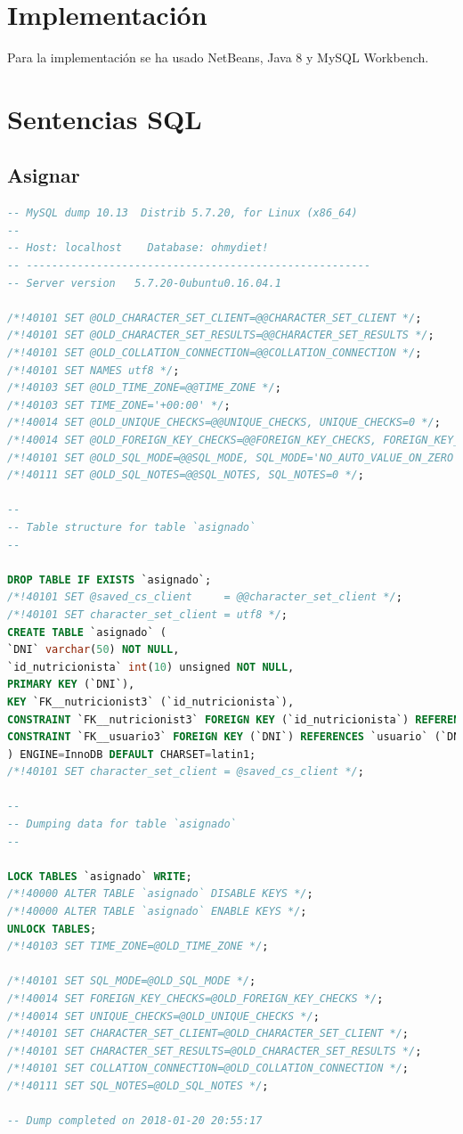 \documentclass[12pt,letterpaper]{article}
\begin{document}
\section{Implementación}
Para la implementación se ha usado NetBeans, Java 8 y MySQL Workbench.


\section{Sentencias SQL}

\subsection{Asignar}
\begin{lstlisting}[language=sql]
-- MySQL dump 10.13  Distrib 5.7.20, for Linux (x86_64)
--
-- Host: localhost    Database: ohmydiet!
-- ------------------------------------------------------
-- Server version	5.7.20-0ubuntu0.16.04.1

/*!40101 SET @OLD_CHARACTER_SET_CLIENT=@@CHARACTER_SET_CLIENT */;
/*!40101 SET @OLD_CHARACTER_SET_RESULTS=@@CHARACTER_SET_RESULTS */;
/*!40101 SET @OLD_COLLATION_CONNECTION=@@COLLATION_CONNECTION */;
/*!40101 SET NAMES utf8 */;
/*!40103 SET @OLD_TIME_ZONE=@@TIME_ZONE */;
/*!40103 SET TIME_ZONE='+00:00' */;
/*!40014 SET @OLD_UNIQUE_CHECKS=@@UNIQUE_CHECKS, UNIQUE_CHECKS=0 */;
/*!40014 SET @OLD_FOREIGN_KEY_CHECKS=@@FOREIGN_KEY_CHECKS, FOREIGN_KEY_CHECKS=0 */;
/*!40101 SET @OLD_SQL_MODE=@@SQL_MODE, SQL_MODE='NO_AUTO_VALUE_ON_ZERO' */;
/*!40111 SET @OLD_SQL_NOTES=@@SQL_NOTES, SQL_NOTES=0 */;

--
-- Table structure for table `asignado`
--

DROP TABLE IF EXISTS `asignado`;
/*!40101 SET @saved_cs_client     = @@character_set_client */;
/*!40101 SET character_set_client = utf8 */;
CREATE TABLE `asignado` (
`DNI` varchar(50) NOT NULL,
`id_nutricionista` int(10) unsigned NOT NULL,
PRIMARY KEY (`DNI`),
KEY `FK__nutricionist3` (`id_nutricionista`),
CONSTRAINT `FK__nutricionist3` FOREIGN KEY (`id_nutricionista`) REFERENCES `nutricionista` (`id_nutricionista`),
CONSTRAINT `FK__usuario3` FOREIGN KEY (`DNI`) REFERENCES `usuario` (`DNI`)
) ENGINE=InnoDB DEFAULT CHARSET=latin1;
/*!40101 SET character_set_client = @saved_cs_client */;

--
-- Dumping data for table `asignado`
--

LOCK TABLES `asignado` WRITE;
/*!40000 ALTER TABLE `asignado` DISABLE KEYS */;
/*!40000 ALTER TABLE `asignado` ENABLE KEYS */;
UNLOCK TABLES;
/*!40103 SET TIME_ZONE=@OLD_TIME_ZONE */;

/*!40101 SET SQL_MODE=@OLD_SQL_MODE */;
/*!40014 SET FOREIGN_KEY_CHECKS=@OLD_FOREIGN_KEY_CHECKS */;
/*!40014 SET UNIQUE_CHECKS=@OLD_UNIQUE_CHECKS */;
/*!40101 SET CHARACTER_SET_CLIENT=@OLD_CHARACTER_SET_CLIENT */;
/*!40101 SET CHARACTER_SET_RESULTS=@OLD_CHARACTER_SET_RESULTS */;
/*!40101 SET COLLATION_CONNECTION=@OLD_COLLATION_CONNECTION */;
/*!40111 SET SQL_NOTES=@OLD_SQL_NOTES */;

-- Dump completed on 2018-01-20 20:55:17

\end{lstlisting}
\end{document}
